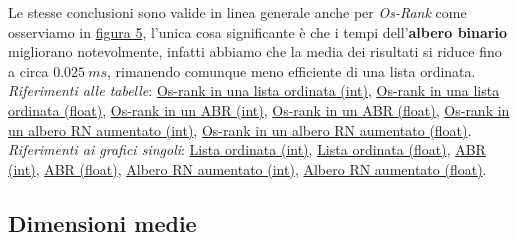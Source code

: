 \documentclass[onecolumn]{article}
\begin{document}
Le stesse conclusioni sono valide in linea generale anche per \textit{Os-Rank} come osserviamo in \hyperref[fig:os-rank-s]{figura 5}, l'unica cosa significante è che i tempi dell'\textbf{albero binario} migliorano notevolmente, infatti abbiamo che la media dei risultati si riduce fino a circa \(0.025\:ms\), rimanendo comunque meno efficiente di una lista ordinata.
\newline
\newline
\textit{Riferimenti alle tabelle}: \hyperref[label:lista-ordinata-s-os-rank]{Os-rank in una lista ordinata (int)}, \hyperref[label:lista-ordinata-s-float-os-rank]{Os-rank in una lista ordinata (float)}, \hyperref[label:abr-s-os-rank]{Os-rank in un ABR (int)}, \hyperref[label:abr-s-float-os-rank]{Os-rank in un ABR (float)}, \hyperref[label:rn-aumentato-s-os-rank]{Os-rank in un albero RN aumentato (int)}, \hyperref[label:rn-aumentato-s-float-os-rank]{Os-rank in un albero RN aumentato (float)}.
\newline
\newline
\textit{Riferimenti ai grafici singoli}: \hyperref[label:lista-ordinata-s]{Lista ordinata (int)}, \hyperref[label:lista-ordinata-s-float]{Lista ordinata (float)}, \hyperref[label:abr-s]{ABR (int)}, \hyperref[label:abr-s-float]{ABR (float)}, \hyperref[label:rn-aumentato-s]{Albero RN aumentato (int)}, \hyperref[label:rn-aumentato-s-float]{Albero RN aumentato (float)}.

\newpage
\subsection{Dimensioni medie}
\end{document}
